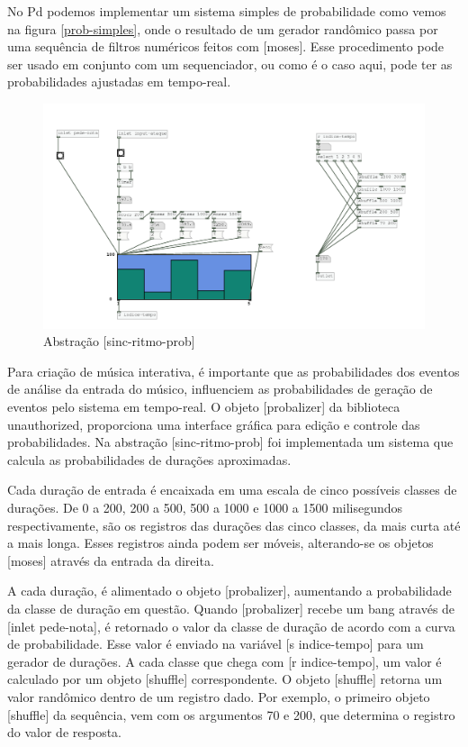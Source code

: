 \documentclass[draft]{ppgmus}
\begin{document}
No Pd podemos implementar um sistema simples de probabilidade como 
vemos na figura \ref{prob-simples}, onde o resultado de um gerador
randômico passa por uma sequência de filtros numéricos feitos
com [moses]. Esse procedimento pode ser usado em conjunto com um sequenciador,
ou como é o caso aqui, pode ter as probabilidades ajustadas em tempo-real.

\begin{figure}
\includegraphics[scale=.6]{sinc-ritmo-prob}
\caption{Abstração [sinc-ritmo-prob]}
\label{sinc-ritmo-prob}
\end{figure}

Para criação de música interativa, é importante que as probabilidades
dos eventos de análise da entrada do músico, influenciem as probabilidades
de geração de eventos pelo sistema em tempo-real.
O objeto [probalizer] da biblioteca unauthorized, proporciona
uma interface gráfica para edição e controle das probabilidades.
Na abstração [sinc-ritmo-prob] foi implementada um sistema
que calcula as probabilidades de durações aproximadas.

Cada duração de entrada é encaixada em uma escala de cinco possíveis
classes de durações. De 0 a 200, 200 a 500, 500 a 1000 e 1000 a 1500 milisegundos
respectivamente, são os registros das durações das cinco classes,
da mais curta até a mais longa. 
Esses registros ainda podem ser móveis, alterando-se os objetos [moses]
através da entrada da direita.


A cada duração, é alimentado o objeto [probalizer], aumentando
a probabilidade da classe de duração em questão.
Quando [probalizer] recebe um bang através de [inlet pede-nota],
é retornado o valor da classe de duração de acordo com a curva
de probabilidade. Esse valor é enviado na variável [s indice-tempo]
para um gerador de durações. A cada classe que chega com [r indice-tempo],
um valor é calculado por um objeto [shuffle] correspondente. O objeto
[shuffle] retorna um valor randômico dentro de um registro dado. Por exemplo,
o primeiro objeto [shuffle] da sequência, vem com os argumentos 70 e 200, que determina
o registro do valor de resposta. 
\end{document}
